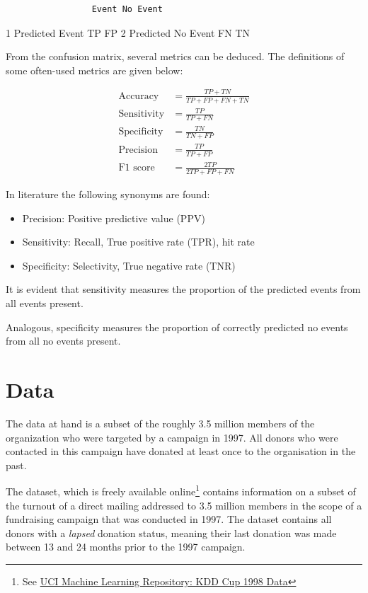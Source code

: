 \documentclass[
  11pt,
  a4paper,
  DIV=12,captions=tableheading,oneside]{scrbook}
\providecommand{\tightlist}{%
  \setlength{\itemsep}{0pt}\setlength{\parskip}{0pt}}
\providecommand{\tightlist}{%
  \setlength{\itemsep}{0pt}\setlength{\parskip}{0pt}}
\begin{document}
\begin{verbatim}
                 Event No Event
\end{verbatim}

1 Predicted Event TP FP
2 Predicted No Event FN TN

From the confusion matrix, several metrics can be deduced. The definitions of some often-used metrics are given below:

\begin{align*}
\text{Accuracy} &= \frac{TP + TN}{TP + FP + FN + TN} \\
\text{Sensitivity} &= \frac{TP}{TP + FN} \\
\text{Specificity} &= \frac{TN}{TN + FP} \\
\text{Precision} &= \frac{TP}{TP + FP} \\
\text{F1 score} &= \frac{2TP}{2TP+FP+FN}
\end{align*}

In literature the following synonyms are found:

\begin{itemize}
\tightlist
\item
  Precision: Positive predictive value (PPV)
\item
  Sensitivity: Recall, True positive rate (TPR), hit rate
\item
  Specificity: Selectivity, True negative rate (TNR)
\end{itemize}

It is evident that sensitivity measures the proportion of the predicted events from all events present.

Analogous, specificity measures the proportion of correctly predicted no events from all no events present.

\hypertarget{data}{%
\chapter{Data}\label{data}}

The data at hand is a subset of the roughly 3.5 million members of the organization who were targeted by a campaign in 1997. All donors who were contacted in this campaign have donated at least once to the organisation in the past.

The dataset, which is freely available online\footnote{See \href{https://archive.ics.uci.edu/ml/datasets/KDD+Cup+1998+Data}{UCI Machine Learning Repository: KDD Cup 1998 Data}} contains information on a subset of the turnout of a direct mailing addressed to 3.5 million members in the scope of a fundraising campaign that was conducted in 1997. The dataset contains all donors with a \emph{lapsed} donation status, meaning their last donation was made between 13 and 24 months prior to the 1997 campaign.
\end{document}
